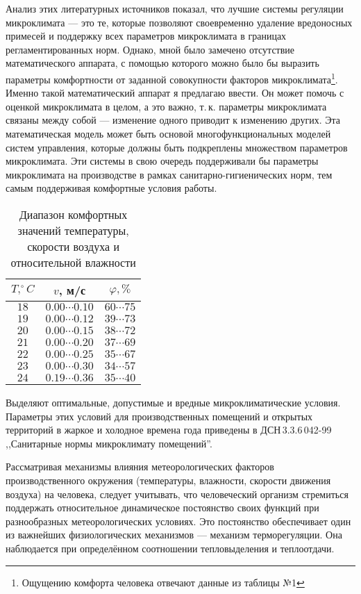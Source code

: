 \documentclass[a4paper,12pt,notitlepage,pdftex,headsepline]{scrartcl}
\begin{document}
  Анализ этих литературных источников показал, что лучшие системы регуляции
  микроклимата --- это те, которые позволяют своевременно удаление вредоносных
  примесей и поддержку всех параметров микроклимата в границах
  регламентированных норм.
  Однако, мной было замечено отсутствие математического аппарата, с помощью
  которого можно было бы выразить параметры комфортности от заданной
  совокупности факторов микроклимата\footnote{Ощущению комфорта человека
  отвечают данные из таблицы №1}.
  Именно такой математический аппарат я предлагаю ввести.
  Он может помочь с оценкой микроклимата в целом, а это важно, т.\,к.
  параметры микроклимата связаны между собой --- изменение одного приводит к
  изменению других.
  Эта математическая модель может быть основой многофункциональных моделей
  систем управления, которые должны быть подкреплены множеством параметров
  микроклимата.
  Эти системы в свою очередь поддерживали бы параметры микроклимата на
  производстве в рамках санитарно-гигиенических норм, тем самым поддерживая
  комфортные условия работы.

  \begin{table}[h]
    \centering
    \begin{tabular}{|c|c|c|}
      \hline
      $T, ^\circ C$ & $v$, м/с & $\varphi, \%$\\
      \hline
      $18$ & $0.00\cdots0.10$ & $60\cdots75$\\
      $19$ & $0.00\cdots0.12$ & $39\cdots73$\\
      $20$ & $0.00\cdots0.15$ & $38\cdots72$\\
      $21$ & $0.00\cdots0.20$ & $37\cdots69$\\
      $22$ & $0.00\cdots0.25$ & $35\cdots67$\\
      $23$ & $0.00\cdots0.30$ & $34\cdots57$\\
      $24$ & $0.19\cdots0.36$ & $35\cdots40$\\
      \hline
    \end{tabular}
    \caption{Диапазон комфортных значений температуры, скорости воздуха и
    относительной влажности}
  \end{table}

  Выделяют оптимальные, допустимые и вредные микроклиматические условия.
  Параметры этих условий для производственных помещений и открытых территорий
  в жаркое и холодное времена года приведены в ДСН\,3.3.6\,042-99 ,,Санитарные
  нормы микроклимату помещений''.

  Рассматривая механизмы влияния метеорологических факторов производственного
  окружения (температуры, влажности, скорости движения воздуха) на человека,
  следует учитывать, что человеческий организм стремиться поддержать
  относительное динамическое постоянство своих функций при разнообразных
  метеорологических условиях.
  Это постоянство обеспечивает один из важнейших физиологических механизмов
  --- механизм терморегуляции.
  Она наблюдается при определённом соотношении тепловыделения и теплоотдачи.
\end{document}
